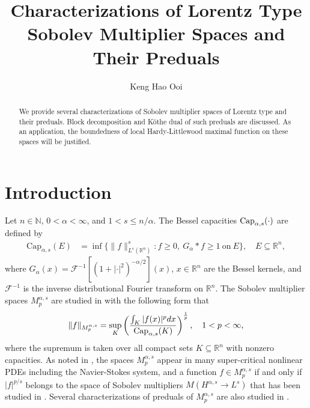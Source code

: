 \documentclass[10pt,reqno]{amsart}
\numberwithin{equation}{section}
\begin{document}
\title[]{Characterizations of Lorentz Type Sobolev Multiplier Spaces and Their Preduals}
\date{}
\author[Keng Hao Ooi]
{Keng Hao Ooi}
\address{Department of Mathematics,
National Central University,
No.300, Jhongda Rd., Jhongli City, Taoyuan County 32001, Taiwan (R.O.C.).}

\begin{abstract}
We provide several characterizations of Sobolev multiplier spaces of Lorentz type and their preduals. Block decomposition and K\"othe dual of such preduals are discussed. As an application, the boundedness of local Hardy-Littlewood maximal function on these spaces will be justified.
\end{abstract}

\maketitle

\section{Introduction}
Let $n\in\mathbb{N}$, $0<\alpha<\infty$, and $1<s\leq n/\alpha$. The Bessel capacities ${\rm Cap}_{\alpha,s}(\cdot)$ are defined by
\begin{align*}
\text{Cap}_{\alpha,s}(E)&=\inf\{\|f\|_{L^{s}(\mathbb{R}^{n})}^{s}:f\geq 0,~G_{\alpha}\ast f\geq 1~\text{on}~E\},\quad E\subseteq\mathbb{R}^{n},
\end{align*}
where $G_{\alpha}(x)=\mathcal{F}^{-1}[(1+\left|\cdot\right|^{2})^{-\alpha/2}](x)$, $x\in\mathbb{R}^{n}$ are the Bessel kernels, and $\mathcal{F}^{-1}$ is the inverse distributional Fourier transform on $\mathbb{R}^{n}$. The Sobolev multiplier spaces $M_{p}^{\alpha,s}$ are studied in \cite{OP} with the following form that 
\begin{align*}
\|f\|_{M_{p}^{\alpha,s}}=\sup_{K}\left(\frac{\int_{K}|f(x)|^{p}dx}{{\rm Cap}_{\alpha,s}(K)}\right)^{\frac{1}{p}},\quad 1<p<\infty,
\end{align*} 
where the supremum is taken over all compact sets $K\subseteq\mathbb{R}^{n}$ with nonzero capacities. As noted in \cite{OP}, the spaces $M_{p}^{\alpha,s}$ appear in many super-critical nonlinear PDEs including the Navier-Stokes system, and a function $f\in M_{p}^{\alpha,s}$ if and only if $|f|^{p/s}$ belongs to the space of Sobolev multipliers $M(H^{\alpha,s}\rightarrow L^{s})$ that has been studied in \cite{MS}. Several characterizations of preduals of $M_{p}^{\alpha,s}$ are also studied in \cite{OP}.
\end{document}
